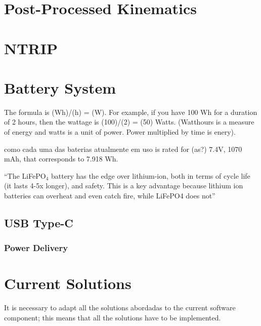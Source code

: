 \section{Post-Processed Kinematics}\label{sec:II_ppk}

\section{NTRIP}\label{sec:II_ntrip}

\section{Battery System}\label{sec:II_battery}

The formula is (Wh)/(h) = (W). For example, if you have 100 Wh for a duration of 2 hours, then the wattage is (100)/(2) = (50) Watts.
(Watthours is a measure of energy and watts is a unit of power. Power multiplied by time is enery).

como cada uma das baterias atualmente em uso is rated for (as?) 7.4V, 1070 mAh, that corresponds to 7.918 Wh.

``The LiFePO$_4$ battery has the edge over lithium-ion, both in terms of cycle life (it lasts 4-5x longer), and safety. This is a key advantage because lithium ion batteries can overheat and even catch fire, while LiFePO4 does not''%

\subsection{USB Type-C}\label{sec:II_usb_c}

\subsubsection{Power Delivery}\label{sec:II_usb_c_PD}

\section{Current Solutions}\label{sec:II_curr_solutions}
It is necessary to adapt all the solutions abordadas to the current software component; this means that all the solutions have to be implemented.

